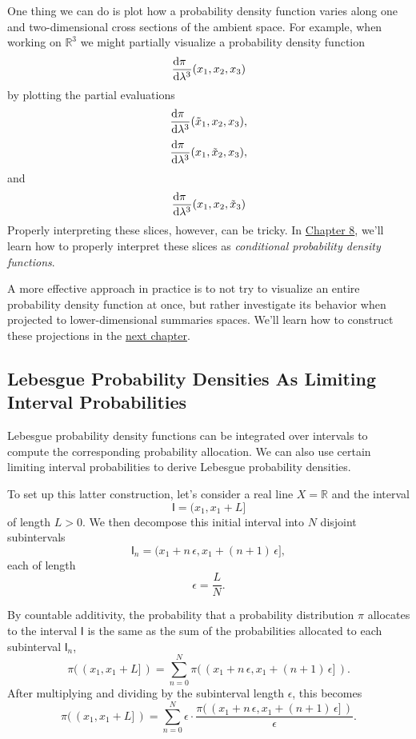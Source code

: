 \documentclass[
  letterpaper,
  DIV=11,
  numbers=noendperiod]{scrartcl}
\begin{document}
One thing we can do is plot how a probability density function varies
along one and two-dimensional cross sections of the ambient space. For
example, when working on \(\mathbb{R}^{3}\) we might partially visualize
a probability density function \[
\frac{ \mathrm{d} \pi \hphantom{ {}^{3} } }{ \mathrm{d} \lambda^{3} }
(x_{1}, x_{2}, x_{3})
\] by plotting the partial evaluations \[
\frac{ \mathrm{d} \pi \hphantom{ {}^{3} } }{ \mathrm{d} \lambda^{3} }
(\tilde{x}_{1}, x_{2}, x_{3}),
\] \[
\frac{ \mathrm{d} \pi \hphantom{ {}^{3} } }{ \mathrm{d} \lambda^{3} }
(x_{1}, \tilde{x}_{2}, x_{3}),
\] and \[
\frac{ \mathrm{d} \pi \hphantom{ {}^{3} } }{ \mathrm{d} \lambda^{3} }
(x_{1}, x_{2}, \tilde{x}_{3})
\] Properly interpreting these slices, however, can be tricky. In
\href{http://www.symplectomorphic.com/assets/chapters_html/conditional_probability_theory.html}{Chapter
8}, we'll learn how to properly interpret these slices as
\emph{conditional probability density functions}.

A more effective approach in practice is to not try to visualize an
entire probability density function at once, but rather investigate its
behavior when projected to lower-dimensional summaries spaces. We'll
learn how to construct these projections in the
\href{http://www.symplectomorphic.com/assets/chapters_html/transforming_probability_spaces.html}{next
chapter}.

\subsection{Lebesgue Probability Densities As Limiting Interval
Probabilities}\label{lebesgue-probability-densities-as-limiting-interval-probabilities}

Lebesgue probability density functions can be integrated over intervals
to compute the corresponding probability allocation. We can also use
certain limiting interval probabilities to derive Lebesgue probability
densities.

To set up this latter construction, let's consider a real line
\(X = \mathbb{R}\) and the interval \[
\mathsf{I} = (x_{1}, x_{1} + L ]
\] of length \(L > 0\). We then decompose this initial interval into
\(N\) disjoint subintervals \[
\mathsf{I}_{n}
= ( x_{1} + n \, \epsilon , x_{1} + (n + 1) \, \epsilon ],
\] each of length \[
\epsilon = \frac{L}{N}.
\]

By countable additivity, the probability that a probability distribution
\(\pi\) allocates to the interval \(\mathsf{I}\) is the same as the sum
of the probabilities allocated to each subinterval \(\mathsf{I}_{n}\),
\[
\pi( \, ( x_{1}, x_{1} + L ] \, )
=
\sum_{n = 0}^{N}
\pi( \, ( x_{1} + n \, \epsilon , x_{1} + (n + 1) \, \epsilon ] \, ).
\] After multiplying and dividing by the subinterval length
\(\epsilon\), this becomes \[
\pi( \, ( x_{1}, x_{1} + L ] \, )
=
\sum_{n = 0}^{N} \epsilon \cdot
\frac{
\pi( \, ( x_{1} + n \, \epsilon, x_{1} + (n + 1) \, \epsilon ] \, )
}{ \epsilon }.
\]
\end{document}
